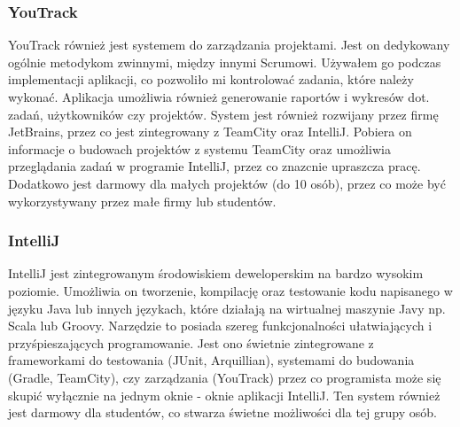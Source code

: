 \subsubsection{YouTrack}
YouTrack również jest systemem do zarządzania projektami. Jest on dedykowany ogólnie metodykom zwinnymi, między innymi Scrumowi. Używałem go podczas implementacji aplikacji, co pozwoliło mi kontrolować zadania, które należy wykonać. Aplikacja umożliwia również generowanie raportów i wykresów dot. zadań, użytkowników czy projektów. System jest również rozwijany przez firmę JetBrains, przez co jest zintegrowany z TeamCity oraz IntelliJ. Pobiera on informacje o budowach projektów z systemu TeamCity oraz umożliwia przeglądania zadań w programie IntelliJ, przez co znazcnie upraszcza pracę. Dodatkowo jest darmowy dla małych projektów (do 10 osób), przez co może być wykorzystywany przez małe firmy lub studentów.

\subsubsection{IntelliJ}
IntelliJ jest zintegrowanym środowiskiem deweloperskim na bardzo wysokim poziomie. Umożliwia on tworzenie, kompilację oraz testowanie kodu napisanego w języku Java lub innych językach, które działają na wirtualnej maszynie Javy np. Scala lub Groovy. Narzędzie to posiada szereg funkcjonalności ułatwiających i przyśpieszających programowanie. Jest ono świetnie zintegrowane z frameworkami do testowania (JUnit, Arquillian), systemami do budowania (Gradle, TeamCity), czy zarządzania (YouTrack) przez co programista może się skupić wyłącznie na jednym oknie - oknie aplikacji IntelliJ. Ten system również jest darmowy dla studentów, co stwarza świetne możliwości dla tej grupy osób.

